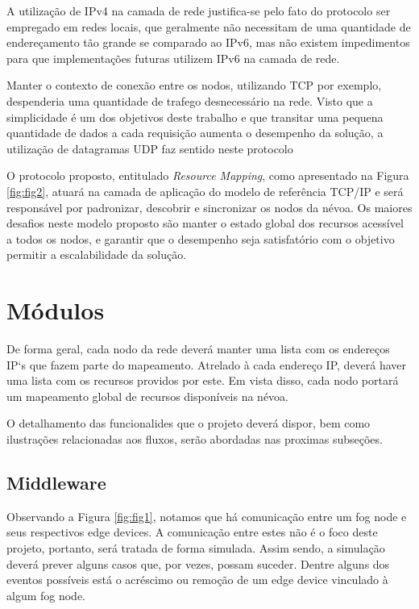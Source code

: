 A utilização de IPv4 na camada de rede justifica-se pelo fato do protocolo ser empregado em redes locais, que geralmente não necessitam de uma quantidade de endereçamento tão grande 
se comparado ao IPv6, mas não existem impedimentos para que implementações futuras utilizem IPv6 na camada de rede.

Manter o contexto de conexão entre os nodos, utilizando TCP por exemplo, despenderia uma quantidade de trafego desnecessário na rede.
Visto que a simplicidade é um dos objetivos deste trabalho e que transitar uma pequena quantidade de dados a cada requisição aumenta o desempenho da solução,
a utilização de datagramas UDP faz sentido neste protocolo

O protocolo proposto, entitulado \textit{Resource Mapping}, como apresentado na Figura \ref{fig:fig2}, atuará na camada de aplicação do modelo de referência TCP/IP \cite{tanenbaum2011redes} e será responsável por padronizar, descobrir e sincronizar os nodos da névoa.
Os maiores desafios neste modelo proposto são manter o estado global dos recursos acessível a todos os nodos, e garantir que o desempenho seja satisfatório com o objetivo permitir a escalabilidade da solução.



\section{Módulos}

De forma geral, cada nodo da rede deverá manter uma lista com os endereços IP`s que fazem parte do mapeamento.
Atrelado à cada endereço IP, deverá haver uma lista com os recursos providos por este.
Em vista disso, cada nodo portará um mapeamento global de recursos disponíveis na névoa.


O detalhamento das funcionalides que o projeto deverá dispor, bem como ilustrações relacionadas aos fluxos, serão abordadas nas proximas subseções.

\subsection{Middleware}

Observando a Figura \ref{fig:fig1}, notamos que há comunicação entre um fog node e seus respectivos edge devices.
A comunicação entre estes não é o foco deste projeto, portanto, será tratada de forma simulada.
Assim sendo, a simulação deverá prever alguns casos que, por vezes, possam suceder. Dentre alguns dos eventos possíveis está
o acréscimo ou remoção de um edge device vinculado à algum fog node.

